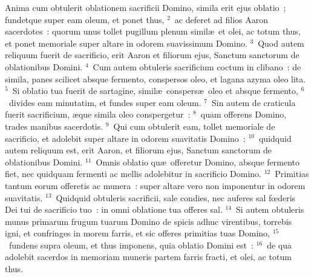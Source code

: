 \lettrine[lines=3,image=true,loversize=0.05,lraise=-0.03]{A}{}nima cum obtulerit oblationem sacrificii Domino, simila erit ejus oblatio~; fundetque super eam oleum, et ponet thus,
${}^{2}$~ac deferet ad filios Aaron sacerdotes~: quorum unus tollet pugillum plenum simil\ae\ et olei, ac totum thus, et ponet memoriale super altare in odorem suavissimum Domino.
${}^{3}$~Quod autem reliquum fuerit de sacrificio, erit Aaron et filiorum ejus, Sanctum sanctorum de oblationibus Domini.
${}^{4}$~Cum autem obtuleris sacrificium coctum in clibano~: de simila, panes scilicet absque fermento, conspersos oleo, et lagana azyma oleo lita.
${}^{5}$~Si oblatio tua fuerit de sartagine, simil\ae\ conspers\ae\ oleo et absque fermento,
${}^{6}$~divides eam minutatim, et fundes super eam oleum.
${}^{7}$~Sin autem de craticula fuerit sacrificium, \ae que simila oleo conspergetur~:
${}^{8}$~quam offerens Domino, trades manibus sacerdotis.
${}^{9}$~Qui cum obtulerit eam, tollet memoriale de sacrificio, et adolebit super altare in odorem suavitatis Domino~:
${}^{10}$~quidquid autem reliquum est, erit Aaron, et filiorum ejus, Sanctum sanctorum de oblationibus Domini.
${}^{11}$~Omnis oblatio qu\ae\ offeretur Domino, absque fermento fiet, nec quidquam fermenti ac mellis adolebitur in sacrificio Domino.
${}^{12}$~Primitias tantum eorum offeretis ac munera~: super altare vero non imponentur in odorem suavitatis.
${}^{13}$~Quidquid obtuleris sacrificii, sale condies, nec auferes sal fœderis Dei tui de sacrificio tuo~: in omni oblatione tua offeres sal.
${}^{14}$~Si autem obtuleris munus primarum frugum tuarum Domino de spicis adhuc virentibus, torrebis igni, et confringes in morem farris, et sic offeres primitias tuas Domino,
${}^{15}$~fundens supra oleum, et thus imponens, quia oblatio Domini est~:
${}^{16}$~de qua adolebit sacerdos in memoriam muneris partem farris fracti, et olei, ac totum thus.

